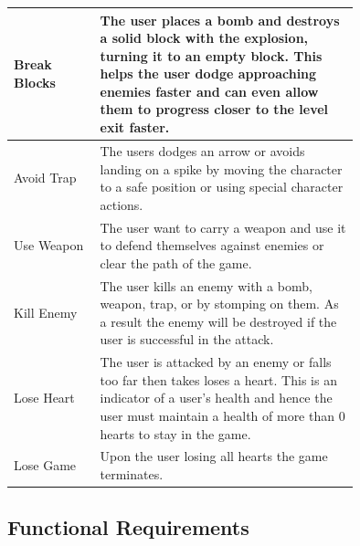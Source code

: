 \documentclass[12pt, titlepage]{article}
\begin{document}
\begin{longtable}{|l|p{0.75\linewidth}|}
\hline
Break Blocks & The user places a bomb and destroys a solid block with the explosion, turning it to an empty block. This helps the user dodge approaching enemies faster and can even allow them to progress closer to the level exit faster.\\
\hline
Avoid Trap & The users dodges an arrow or avoids landing on a spike by moving the character to a safe position or using special character actions.\\
\hline
Use Weapon & The user want to carry a weapon and use it to defend themselves against enemies or clear the path of the game.\\
\hline
Kill Enemy & The user kills an enemy with a bomb, weapon, trap, or by stomping on them. As a result the enemy will be destroyed if the user is successful in the attack.\\
\hline
Lose Heart & The user is attacked by an enemy or falls too far then takes loses a heart. This is an indicator of a user's health and hence the user must maintain a health of more than 0 hearts to stay in the game.\\
\hline
Lose Game & Upon the user losing all hearts the game terminates.\\
\hline
\end{longtable}

\subsection{Functional Requirements}
\end{document}
